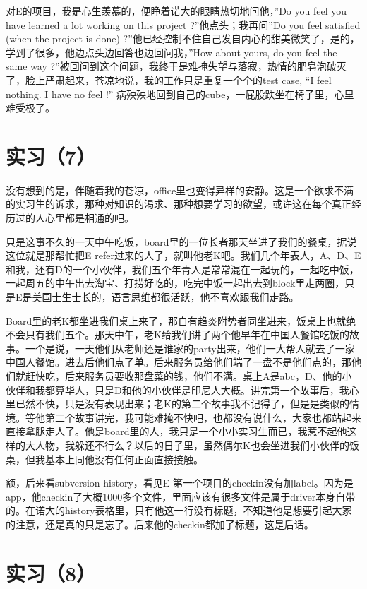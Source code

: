 \documentclass[12pt]{book}
\begin{document}
对E的项目，我是心生羡慕的，便睁着诺大的眼睛热切地问他，”Do you feel you have learned a lot working on this project ?”他点头；我再问”Do you feel satisfied (when the project is done) ?”他已经控制不住自己发自内心的甜美微笑了，是的，学到了很多，他边点头边回答也边回问我，”How about yours, do you feel the same way ?”被回问到这个问题，我终于是难掩失望与落寂，热情的肥皂泡破灭了，脸上严肃起来，苍凉地说，我的工作只是重复一个个的test case, “I feel nothing.  I have no feel !” 病殃殃地回到自己的cube，一屁股跌坐在椅子里，心里难受极了。

\section{实习（7）}
\label{sec-5-10}

没有想到的是，伴随着我的苍凉，office里也变得异样的安静。这是一个欲求不满的实习生的诉求，那种对知识的渴求、那种想要学习的欲望，或许这在每个真正经历过的人心里都是相通的吧。

只是这事不久的一天中午吃饭，board里的一位长者那天坐进了我们的餐桌，据说这位就是那帮忙把E refer过来的人了，就叫他老K吧。我们几个年表人，A、D、E和我，还有D的一个小伙伴，我们五个年青人是常常混在一起玩的，一起吃中饭，一起周五的中午出去淘宝、打捞好吃的，吃完中饭一起出去到block里走两圈，只是E是美国士生士长的，语言思维都很活跃，他不喜欢跟我们走路。

Board里的老K都坐进我们桌上来了，那自有趋炎附势者同坐进来，饭桌上也就绝不会只有我们五个。那天中午，老K给我们讲了两个他早年在中国人餐馆吃饭的故事。一个是说，一天他们从老师还是谁家的party出来，他们一大帮人就去了一家中国人餐馆。进去后他们点了单。后来服务员给他们端了一盘不是他们点的，那他们就赶快吃，后来服务员要收那盘菜的钱，他们不满。桌上A是abc，D、他的小伙伴和我都算华人，只是D和他的小伙伴是印尼人大概。讲完第一个故事后，我心里已然不快，只是没有表现出来；老K的第二个故事我不记得了，但是是类似的情境。等他第二个故事讲完，我可能难掩不快吧，也都没有说什么，大家也都站起来直接拿腿走人了。他是board里的人，我只是一个小小实习生而已，我惹不起他这样的大人物，我躲还不行么？以后的日子里，虽然偶尔K也会坐进我们小伙伴的饭桌，但我基本上同他没有任何正面直接接触。

额，后来看subversion history，看见E 第一个项目的checkin没有加label。因为是app，他checkin了大概1000多个文件，里面应该有很多文件是属于driver本身自带的。在诺大的history表格里，只有他这一行没有标题，不知道他是想要引起大家的注意，还是真的只是忘了。后来他的checkin都加了标题，这是后话。

\section{实习（8）}
\label{sec-5-11}
\end{document}
